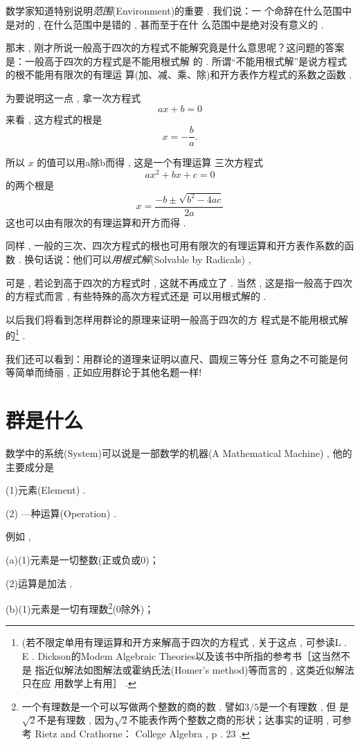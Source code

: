 数学家知道特别说明\emph{范围}(Environment)的重要 . 我们说：一 个命辞在什么范围中是对的 , 在什么范围中是错的 , 甚而至于在什 么范围中是绝对没有意义的 . 

那末 , 刚才所说一般高于四次的方程式不能解究竟是什么意思呢？这问题的答案是：一般高于四次的方程式是不能用根式解 的 . 所谓“不能用根式解”是说方程式的根不能用有限次的有理运 算(加、减、乘、除)和开方表作方程式的系数之函数 . 

为要说明这一点 , 拿一次方程式
\[ax+b = 0\]
来看 , 这方程式的根是
\[
x=-\dfrac{b}{a} . 
\]

所以 $x$ 的值可以用a除b而得 , 这是一个有理运算 三次方程式
\[
a x^{2}+b x+c=0
\]
的两个根是
\[
x=\dfrac{-b \pm \sqrt{b^{2}-4 a c}}{2a}
\]
这也可以由有限次的有理运算和开方而得 . 

同样 , 一般的三次、四次方程式的根也可用有限次的有理运算和开方表作系数的函数 . 换句话说：他们可以\emph{用根式解}(Solvable by Radicals) , 

可是 , 若论到高于四次的方程式时 , 这就不再成立了 . 当然 ,  这是指一般高于四次的方程式而言 , 有些特殊的高次方程式还是 可以用根式解的 . 

以后我们将看到怎样用群论的原理来证明一般高于四次的方 程式是不能用根式解的\footnote{(若不限定单用有理运算和开方来解高于四次的方程式 , 关于这点 , 可参读L .  E . Dickson的Modem Algebraic Theories以及该书中所指的参考书［这当然不是 指近似解法如图解法或霍纳氏法(Homer's method)等而言的 , 这类近似解法只在应 用数学上有用］ . } . 

我们还可以看到：用群论的道理来证明以直尺、圆规三等分任 意角之不可能是何等简单而绮丽 , 正如应用群论于其他名题一样!

\section{群是什么}

数学中的系统(System)可以说是一部数学的机器(A Mathematical Machine) , 他的主要成分是

(1)元素(Element) . 

(2)	—种运算(Operation) . 

例如 , 

(a)(1)元素是一切整数(正或负或0)；

(2)运算是加法 . 

(b)(1)元素是一切有理数\footnote{一个有理数是一个可以写做两个整数的商的数 . 譬如$3/5$是一个有理数 , 但 是$\sqrt{2}$不是有理数 , 因为$\sqrt{2}$不能表作两个整数之商的形状；达事实的证明 , 可参考 Rietz and Crathorne： College Algebra , p . 23 . }(0除外)；

